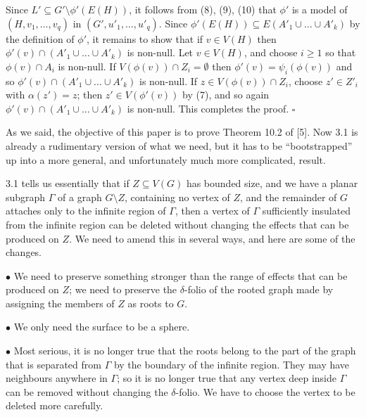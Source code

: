 Since $L' \subseteq G' \setminus \phi'(E(H))$, it follows from (8), (9), (10) that $\phi'$ is a model of $(H, v_1, \ldots, v_q)$ in $(G', u'_1, \ldots, u'_q)$. Since $\phi'(E(H)) \subseteq E(A'_1 \cup \dots \cup A'_k)$ by the definition of $\phi'$, it remains to show that if $v \in V(H)$ then $\phi'(v) \cap (A'_1 \cup \dots \cup A'_k)$ is non-null. Let $v \in V(H)$, and choose $i \ge 1$ so that $\phi(v) \cap A_i$ is non-null. If $V(\phi(v)) \cap Z_i = \emptyset$ then $\phi'(v) = \psi_i(\phi(v))$ and so $\phi'(v) \cap (A'_1 \cup \dots \cup A'_k)$ is non-null. If $z \in V(\phi(v)) \cap Z_i$, choose $z' \in Z'_i$ with $\alpha(z') = z$; then $z' \in V(\phi'(v))$ by (7), and so again $\phi'(v) \cap (A'_1 \cup \dots \cup A'_k)$ is non-null. This completes the proof. $\square$


As we said, the objective of this paper is to prove Theorem 10.2 of [5]. Now 3.1 is already a rudimentary version of what we need, but it has to be ``bootstrapped'' up into a more general, and unfortunately much more complicated, result.

3.1 tells us essentially that if $Z \subseteq V(G)$ has bounded size, and we have a planar subgraph $\Gamma$ of a graph $G \setminus Z$, containing no vertex of $Z$, and the remainder of $G$ attaches only to the infinite region of $\Gamma$, then a vertex of $\Gamma$ sufficiently insulated from the infinite region can be deleted without changing the effects that can be produced on $Z$. We need to amend this in several ways, and here are some of the changes.

\hspace*{12pt}$\bullet$ We need to preserve something stronger than the range of effects that can be produced on $Z$; we need to preserve the $\delta$-folio of the rooted graph made by assigning the members of $Z$ as roots to $G$.

\hspace*{12pt}$\bullet$ We only need the surface to be a sphere.

\hspace*{12pt}$\bullet$ Most serious, it is no longer true that the roots belong to the part of the graph that is separated from $\Gamma$ by the boundary of the infinite region. They may have neighbours anywhere in $\Gamma$; so it is no longer true that any vertex deep inside $\Gamma$ can be removed without changing the $\delta$-folio. We have to choose the vertex to be deleted more carefully.

